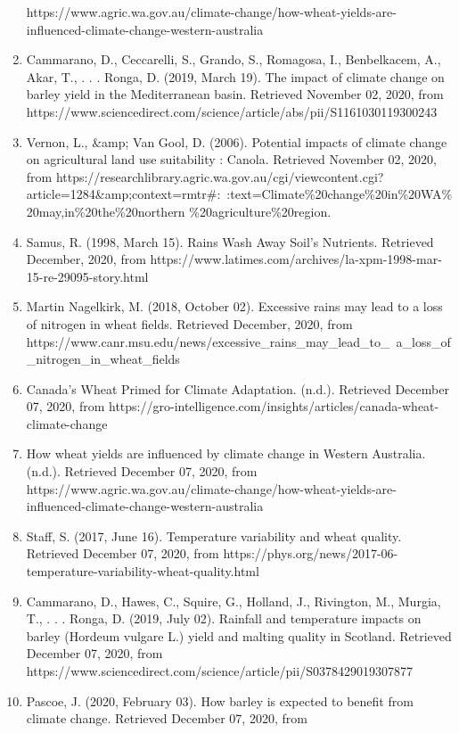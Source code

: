 \documentclass[fontsize=11pt]{article}
\begin{document}
\begin{enumerate}
    https://www.agric.wa.gov.au/climate-change/how-wheat-yields-are-influenced-climate-change-western-australia
    \item Cammarano, D., Ceccarelli, S., Grando, S., Romagosa, I., Benbelkacem, A., Akar, T., . . . Ronga, D. (2019, March 19). The impact of climate change on barley yield in the Mediterranean basin. Retrieved November 02, 2020, from https://www.sciencedirect.com/science/article/abs/pii/S1161030119300243
    \item Vernon, L., {\&}amp; Van Gool, D. (2006). Potential impacts of climate change on agricultural land use suitability : Canola. Retrieved November 02, 2020, from https://researchlibrary.agric.wa.gov.au/cgi/viewcontent.cgi?
    article=1284{\&}amp;context=rmtr\#:~:text=Climate\%20change\%20in\%20WA\%20may,in\%20the\%20northern
    \%20agriculture\%20region.
    \item Samus, R. (1998, March 15). Rains Wash Away Soil's Nutrients. Retrieved December, 2020, from \newline
    https://www.latimes.com/archives/la-xpm-1998-mar-15-re-29095-story.html
    \item Martin Nagelkirk, M. (2018, October 02). Excessive rains may lead to a loss of nitrogen in wheat fields. Retrieved December, 2020, from \newline https://www.canr.msu.edu/news/excessive\_rains\_may\_lead\_to\_\ a\_loss\_of\_nitrogen\_in\_wheat\_fields
    \item Canada's Wheat Primed for Climate Adaptation. (n.d.). Retrieved December 07, 2020, from https://gro-intelligence.com/insights/articles/canada-wheat-climate-change
    \item How wheat yields are influenced by climate change in Western Australia. (n.d.). Retrieved December 07, 2020, from https://www.agric.wa.gov.au/climate-change/how-wheat-yields-are-influenced-climate-change-western-australia
    \item Staff, S. (2017, June 16). Temperature variability and wheat quality. Retrieved December 07, 2020, from https://phys.org/news/2017-06-temperature-variability-wheat-quality.html
    \item Cammarano, D., Hawes, C., Squire, G., Holland, J., Rivington, M., Murgia, T., . . . Ronga, D. (2019, July 02). Rainfall and temperature impacts on barley (Hordeum vulgare L.) yield and malting quality in Scotland. Retrieved December 07, 2020, from https://www.sciencedirect.com/science/article/pii/S0378429019307877
    \item Pascoe, J. (2020, February 03). How barley is expected to benefit from climate change. Retrieved December 07, 2020, from
    

\end{enumerate}
\end{document}
